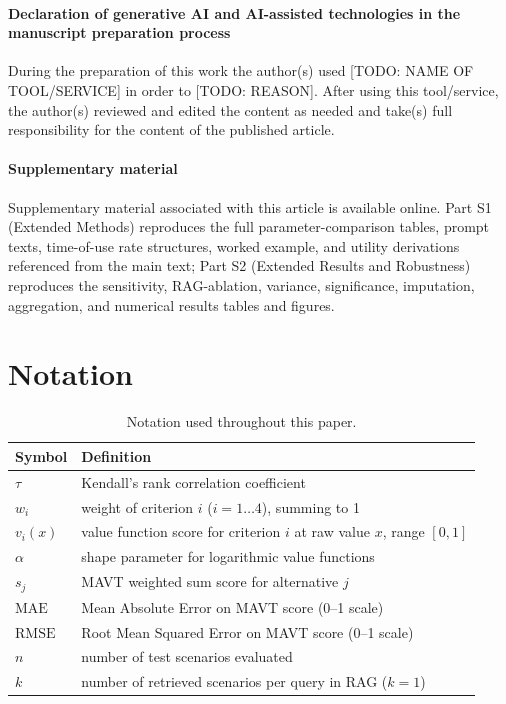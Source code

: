 \documentclass[a4paper,fleqn]{cas-dc}
\begin{document}
\paragraph*{Declaration of generative AI and AI-assisted technologies in the manuscript preparation process}
During the preparation of this work the author(s) used [TODO: NAME OF TOOL/SERVICE] in order to [TODO: REASON]. After using this tool/service, the author(s) reviewed and edited the content as needed and take(s) full responsibility for the content of the published article.

\paragraph*{Supplementary material}
Supplementary material associated with this article is available online. Part S1 (Extended Methods) reproduces the full parameter-comparison tables, prompt texts, time-of-use rate structures, worked example, and utility derivations referenced from the main text; Part S2 (Extended Results and Robustness) reproduces the sensitivity, RAG-ablation, variance, significance, imputation, aggregation, and numerical results tables and figures.



\newpage

\appendix
\section{Notation}
\label{app:notation}
\begin{table}[t]
\begin{threeparttable}
\small
\centering
\renewcommand{\arraystretch}{1.15}
\begin{tabular}{@{} l p{} @{}}
\toprule
Symbol & Definition \\
\midrule
$\tau$ & Kendall's rank correlation coefficient \\
$w_i$ & weight of criterion $i$ ($i=1\ldots4$), summing to 1 \\
$v_i(x)$ & value function score for criterion $i$ at raw value $x$, range $[0,1]$ \\
$\alpha$ & shape parameter for logarithmic value functions \\
$s_j$ & MAVT weighted sum score for alternative $j$ \\
$\text{MAE}$ & Mean Absolute Error on MAVT score (0--1 scale) \\
$\text{RMSE}$ & Root Mean Squared Error on MAVT score (0--1 scale) \\
$n$ & number of test scenarios evaluated \\
$k$ & number of retrieved scenarios per query in RAG ($k=1$) \\
\bottomrule
\end{tabular}
\renewcommand{\arraystretch}{1.0}
\end{threeparttable}
\caption{Notation used throughout this paper.}
\label{tab:item1}
\end{table}
\end{document}
